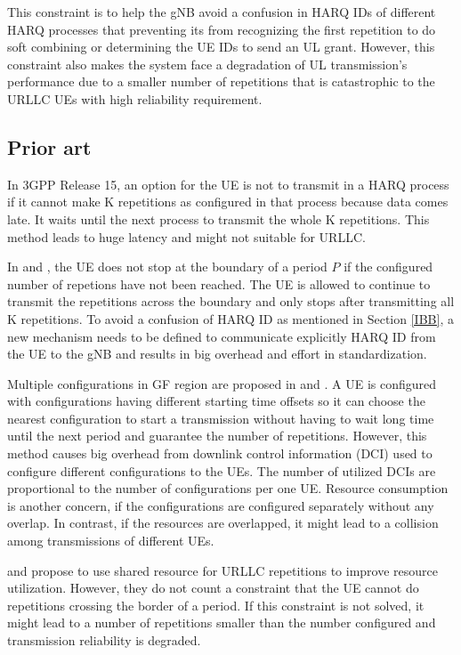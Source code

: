 \documentclass[conference]{IEEEtran}
\begin{document}
This constraint is to help the gNB avoid a confusion in HARQ IDs of different HARQ processes that preventing its from recognizing the first repetition to do soft combining or determining the UE IDs to send an UL grant. However, this constraint also makes the system face a degradation of UL transmission's performance due to a smaller number of repetitions that is catastrophic to the URLLC UEs with high reliability requirement. 

\subsection{Prior art}\label{ICC}
In 3GPP Release 15, an option for the UE is not to transmit in a HARQ process if it cannot make K repetitions as configured in that process because data comes late. It waits until the next process to transmit the whole K repetitions. This method leads to huge latency and might not suitable for URLLC.

In \cite{b1} and \cite{b2}, the UE does not stop at the boundary of a period $P$ if the configured number of repetions have not been reached. The UE is allowed to continue to transmit the repetitions across the boundary and only stops after transmitting all K repetitions. To avoid a confusion of HARQ ID as mentioned in Section \ref{IBB}, a new mechanism needs to be defined to communicate explicitly HARQ ID from the UE to the gNB and results in big overhead and effort in standardization.  

Multiple configurations in GF region are proposed in \cite{b3} and \cite{b4}. A UE is configured with configurations having different starting time offsets so it can choose the nearest configuration to start a transmission without having to wait long time until the next period and guarantee the number of repetitions. However, this method causes big overhead from downlink control information (DCI) used to configure different configurations to the UEs. The number of utilized DCIs are proportional to the number of configurations per one UE. Resource consumption is another concern, if the configurations are configured separately without any overlap. In contrast, if the resources are overlapped, it might lead to a collision among transmissions of different UEs.

\cite{b5} and \cite{b7} propose to use shared resource for URLLC repetitions to improve resource utilization. However, they do not count a constraint that the UE cannot do repetitions crossing the border of a period. If this constraint is not solved, it might lead to a number of repetitions smaller than the  number configured and transmission reliability is degraded.
\end{document}
